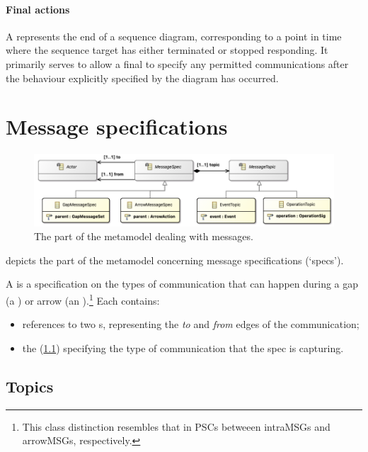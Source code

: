 \paragraph{Final actions}

A \mfinalaction{} represents the end of a sequence diagram, corresponding
to a point in time where the sequence target has either terminated or stopped
responding.  It primarily serves to allow a final \msequencegap{} to specify
any permitted communications after the behaviour explicitly specified by the
diagram has occurred.


\section{Message specifications}\label{sec:metamodel-messages}

\begin{figure}
	\centering
	\includegraphics[width=.8\textwidth]{diagrams/messages.png}
	\caption{The part of the \langname{} metamodel dealing with messages.}
	\label{fig:metamodel-messages}
\end{figure}

 depicts the part of the metamodel concerning
message specifications (`specs').

A \mmessagespec{} is a specification on the types of communication that can
happen during a gap (a \mgapmessagespec) or arrow (an \marrowmessagespec).\footnote{
This class distinction resembles that in PSCs betweeen intraMSGs and arrowMSGs,
respectively.}  Each \mmessagespec{} contains:

\begin{itemize}
\item
	references to two \mactor s, representing the \emph{to} and \emph{from}
	edges of the communication;
\item
	the \mmessagetopic{} (\cref{ssec:metamodel-messages-topics}) specifying
	the type of communication that the spec is capturing.
\end{itemize}

\subsection{Topics}\label{ssec:metamodel-messages-topics}

